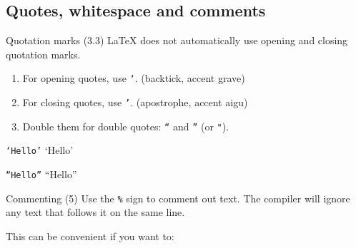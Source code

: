 \documentclass{beamer}
\begin{document}
\subsection{Quotes, whitespace and comments}

\begin{frame}{Quotation marks (3.3)}
    \LaTeX{} does not automatically use opening and closing quotation marks.

    \medskip

    \begin{enumerate}
        \item For opening quotes, use \texttt{`}. \hfill{\small (backtick, accent grave)}
        \item For closing quotes, use \texttt{'}. \hfill{\small (apostrophe, accent aigu)}
        \item Double them for double quotes: \texttt{``} and \texttt{''} (or \texttt{"}).
    \end{enumerate}

    \medskip

    \begin{center}
        \large
        \texttt{`Hello'} \textrightarrow{} `Hello'

        \texttt{``Hello''} \textrightarrow{} ``Hello''
    \end{center}
\end{frame}

\begin{frame}{Commenting (5)}
    Use the \texttt{\%} sign to comment out text. The compiler will ignore any text that follows it on the same line.

    \bigskip

    This can be convenient if you want to:

    \medskip


    \medskip

\end{frame}
\end{document}
